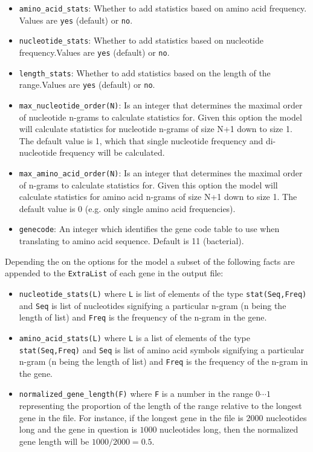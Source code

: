 \documentclass{book}
\begin{document}
\begin{itemize}
\item \texttt{amino\_acid\_stats}: Whether to add statistics based on amino acid frequency. Values are \texttt{yes} (default) or \texttt{no}.
\item \texttt{nucleotide\_stats}: Whether to add statistics based on nucleotide frequency.Values are \texttt{yes} (default) or \texttt{no}.
\item \texttt{length\_stats}: Whether to add statistics based on the length of the range.Values are \texttt{yes} (default) or \texttt{no}.
\item \texttt{max\_nucleotide\_order(N)}: Is an integer that determines the maximal order of nucleotide n-grams to calculate statistics for. Given this option the 
model will calculate statistics for nucleotide n-grams of size N+1 down to size 1. The default value is 1, which that single nucleotide frequency and di-nucleotide frequency will be calculated.
\item \texttt{max\_amino\_acid\_order(N)}: Is an integer that determines the maximal order of n-grams to calculate statistics for. Given this option the 
model will calculate statistics for amino acid n-grams of size N+1 down to size 1. The default value is 0 (e.g. only single amino acid frequencies).
\item \texttt{genecode}: An integer which identifies the gene code table to use when translating to amino acid sequence. Default is 11 (bacterial).
\end{itemize}

Depending the on the options for the model a subset of  the following facts are appended to the \texttt{ExtraList} of each gene in the output file:

\begin{itemize}
\item \texttt{nucleotide\_stats(L)} where \texttt{L} is list of elements of the type \texttt{stat(Seq,Freq)} and \texttt{Seq} is list of nucleotides signifying a particular n-gram (n being the length of list) and \texttt{Freq} is the frequency of the n-gram in the gene.
\item \texttt{amino\_acid\_stats(L)} where \texttt{L} is a list of elements of the type \texttt{stat(Seq,Freq)} and \texttt{Seq} is list of amino acid symbols signifying a particular n-gram (n being the length of list) and \texttt{Freq} is the frequency of the n-gram in the gene.
\item \texttt{normalized\_gene\_length(F)} where \texttt{F} is a number in the range $0\cdots1$ representing the proportion of the length of the range relative to the longest gene in the file. For instance, if the longest gene in the file is $2000$ nucleotides long and the gene in question is $1000$ nucleotides long, then the normalized gene length will be $1000/2000 = 0.5$.
\end{itemize}
\end{document}
